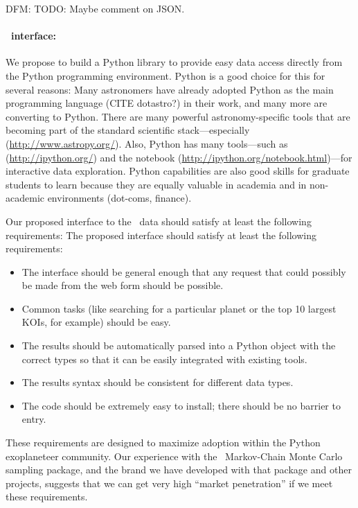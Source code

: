 \documentclass[letterpaper,12pt,preprint]{hack_aastex}
\newcommand{\kplr}{\package{kplr}}
\newcommand{\emcee}{\package{emcee}}
\begin{document}
DFM:  TODO:  Maybe comment on JSON.

\paragraph{\kplr\ interface:}
We propose to build a Python library to provide easy data access directly
from the Python programming environment.
Python is a good choice for this for several reasons:
Many astronomers have already adopted Python as the main
programming language (CITE dotastro?) in their work, and many more are
converting to Python.
There are many powerful astronomy-specific tools that are becoming part of
the standard scientific stack---especially 
 (\url{http://www.astropy.org/}).
Also, Python has many tools---such as 
 (\url{http://ipython.org/}) and the  notebook
 (\url{http://ipython.org/notebook.html})---for interactive data exploration.
Python capabilities are also good skills for graduate students to learn
because they are equally valuable in academia and in non-academic
environments (dot-coms, finance).

Our proposed interface to the \Kepler\ data should satisfy at least the
following requirements:
The proposed interface should satisfy at least the following requirements:
\begin{itemize}
\item The interface should be general enough that any request that could
possibly be made from the web form should be possible.
\item Common tasks (like searching for a particular planet or the top 10
largest KOIs, for example) should be easy.
\item The results should be automatically parsed into a Python object with the
correct types so that it can be easily integrated with existing tools.
\item The results syntax should be consistent for different data types.
\item The code should be extremely easy to install; there should be no
barrier to entry.
\end{itemize}
These requirements are designed to maximize adoption within the Python
exoplaneteer community.
Our experience with the \emcee\ Markov-Chain Monte Carlo sampling package,
and the brand we have developed with that package and other projects,
suggests that we can get very high ``market penetration'' if we meet these
requirements.
\end{document}

